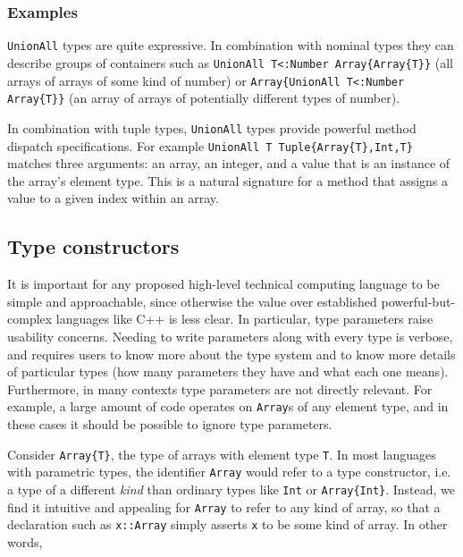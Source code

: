 
\subsubsection{Examples}

\texttt{UnionAll} types are quite expressive. In combination with nominal
types they can describe groups of containers such as
\texttt{UnionAll T<:Number Array\{Array\{T\}\}} (all arrays of arrays of
some kind of number) or
\texttt{Array\{UnionAll T<:Number Array\{T\}\}} (an array of arrays of
potentially different types of number).

In combination with tuple types, \texttt{UnionAll} types provide powerful
method dispatch specifications. For example
\texttt{UnionAll T Tuple\{Array\{T\},Int,T\}} matches three arguments:
an array, an integer, and a value that is an instance of the array's
element type. This is a natural signature for a method that assigns a
value to a given index within an array.


\subsection{Type constructors}

It is important for any proposed high-level technical computing language to be
simple and approachable, since otherwise the value over established
powerful-but-complex languages like C++ is less clear.
In particular, type parameters raise usability concerns.
Needing to write parameters along with every type is verbose, and requires users
to know more about the type system and to know more details of particular
types (how many parameters they have and what each one means).
Furthermore, in many contexts type parameters are not directly relevant.
For example, a large amount of code operates on \texttt{Array}s of any
element type, and in these cases it should be possible to ignore type parameters.

Consider \texttt{Array\{T\}}, the type of arrays with element type \texttt{T}.
In most languages with parametric types, the identifier \texttt{Array} would
refer to a type constructor, i.e. a type of a different \emph{kind} than
ordinary types like \texttt{Int} or \texttt{Array\{Int\}}.
Instead, we find it intuitive and appealing for \texttt{Array} to refer to
any kind of array, so that a declaration such as \texttt{x::Array} simply
asserts \texttt{x} to be some kind of array. In other words,

